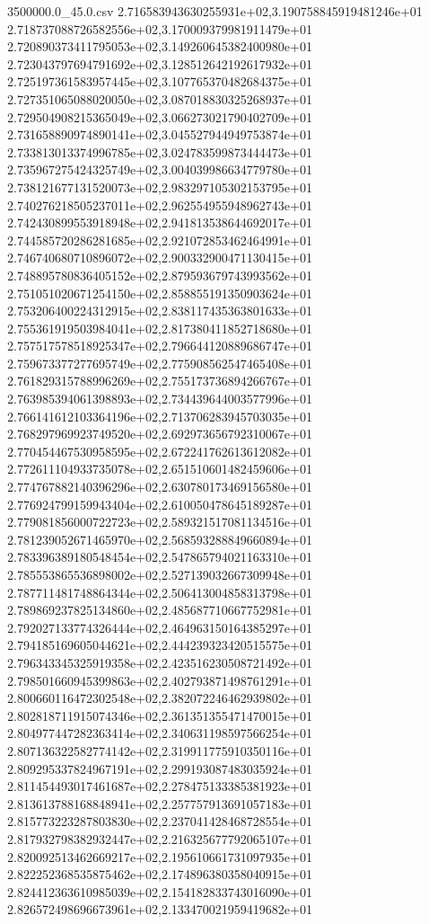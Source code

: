 \begin{filecontents*}{3500000.0_45.0.csv}
2.716583943630255931e+02,3.190758845919481246e+01
2.718737088726582556e+02,3.170009379981911479e+01
2.720890373411795053e+02,3.149260645382400980e+01
2.723043797694791692e+02,3.128512642192617932e+01
2.725197361583957445e+02,3.107765370482684375e+01
2.727351065088020050e+02,3.087018830325268937e+01
2.729504908215365049e+02,3.066273021790402709e+01
2.731658890974890141e+02,3.045527944949753874e+01
2.733813013374996785e+02,3.024783599873444473e+01
2.735967275424325749e+02,3.004039986634779780e+01
2.738121677131520073e+02,2.983297105302153795e+01
2.740276218505237011e+02,2.962554955948962743e+01
2.742430899553918948e+02,2.941813538644692017e+01
2.744585720286281685e+02,2.921072853462464991e+01
2.746740680710896072e+02,2.900332900471130415e+01
2.748895780836405152e+02,2.879593679743993562e+01
2.751051020671254150e+02,2.858855191350903624e+01
2.753206400224312915e+02,2.838117435363801633e+01
2.755361919503984041e+02,2.817380411852718680e+01
2.757517578518925347e+02,2.796644120889686747e+01
2.759673377277695749e+02,2.775908562547465408e+01
2.761829315788996269e+02,2.755173736894266767e+01
2.763985394061398893e+02,2.734439644003577996e+01
2.766141612103364196e+02,2.713706283945703035e+01
2.768297969923749520e+02,2.692973656792310067e+01
2.770454467530958595e+02,2.672241762613612082e+01
2.772611104933735078e+02,2.651510601482459606e+01
2.774767882140396296e+02,2.630780173469156580e+01
2.776924799159943404e+02,2.610050478645189287e+01
2.779081856000722723e+02,2.589321517081134516e+01
2.781239052671465970e+02,2.568593288849660894e+01
2.783396389180548454e+02,2.547865794021163310e+01
2.785553865536898002e+02,2.527139032667309948e+01
2.787711481748864344e+02,2.506413004858313798e+01
2.789869237825134860e+02,2.485687710667752981e+01
2.792027133774326444e+02,2.464963150164385297e+01
2.794185169605044621e+02,2.444239323420515575e+01
2.796343345325919358e+02,2.423516230508721492e+01
2.798501660945399863e+02,2.402793871498761291e+01
2.800660116472302548e+02,2.382072246462939802e+01
2.802818711915074346e+02,2.361351355471470015e+01
2.804977447282363414e+02,2.340631198597566254e+01
2.807136322582774142e+02,2.319911775910350116e+01
2.809295337824967191e+02,2.299193087483035924e+01
2.811454493017461687e+02,2.278475133385381923e+01
2.813613788168848941e+02,2.257757913691057183e+01
2.815773223287803830e+02,2.237041428468728554e+01
2.817932798382932447e+02,2.216325677792065107e+01
2.820092513462669217e+02,2.195610661731097935e+01
2.822252368535875462e+02,2.174896380358040915e+01
2.824412363610985039e+02,2.154182833743016090e+01
2.826572498696673961e+02,2.133470021959419682e+01

\end{filecontents*}
